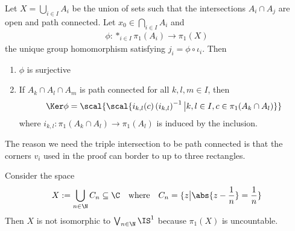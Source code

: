 \begin{thm}
  Let $X = \bigcup_{i \in I}A_i$ be the union of sets such that the intersections $A_i \cap A_j$ are open and path connected.
  Let $x_0 \in \bigcap_{i \in I}A_i$ and 
  \begin{align*}
    \phi: \ast_{i \in I}\pi_1(A_i) \to  \pi_1(X)
  \end{align*}
  the unique group homomorphism satisfying $j_i = \phi \circ \iota_i$.
  Then
  \begin{enumerate}
    \item $\phi$ is surjective
    \item If $A_k \cap A_l \cap A_m$ is path connected for all $k,l,m \in I$, then
      \begin{align*}
        \Ker \phi = \scal{\scal{
            i_{k,l}(c) \left(
              i_{k,l}
            \right)^{-1}
            \big\vert
            k,l \in I,
            c \in \pi_1(A_k \cap A_l)
        }}
      \end{align*}
      where $i_{k,l}: \pi_1(A_k \cap A_l) \to  \pi_1(A_l)$ is induced by the inclusion.
  \end{enumerate}
\end{thm}

The reason we need the triple intersection to be path connected is that the corners $v_i$ used in the proof can border to up to three rectangles.

\begin{ex}
Consider the space
\begin{align*}
  X := \bigcup_{n \in \N}C_n \subseteq \C \quad \text{where} \quad C_n = \{z \big\vert \abs{z - \frac{1}{n}} = \frac{1}{n}\}
\end{align*}
Then $X$ is not isomorphic to $\bigvee_{n \in \N}\IS^{1}$ because $\pi_1(X)$ is uncountable.
\end{ex}
